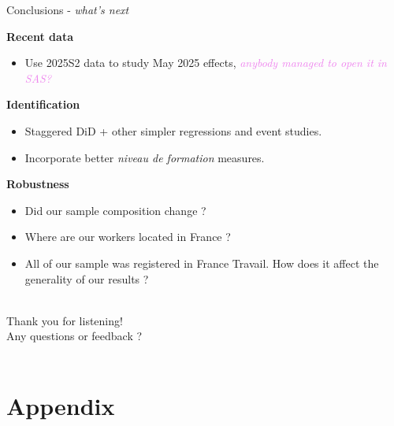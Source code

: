 \documentclass[aspectratio=169,10pt,xcolor={dvipsnames}]{beamer}
\begin{document}
\begin{frame}{Conclusions - \textit{what's next}}

\alert{\textbf{Recent data}}
\begin{itemize}
	\item Use 2025S2 data to study May 2025 effects, \textcolor{violet}{\textit{anybody managed to open it in SAS?}}
\end{itemize}
\vspace{0.2cm}

\alert{\textbf{Identification}}
\begin{itemize}
	\item Staggered DiD + other simpler regressions and event studies.
	\item Incorporate better \textit{niveau de formation} measures.
\end{itemize}
\vspace{0.2cm}
\alert{\textbf{Robustness}}
\begin{itemize}
	\item Did our sample composition change ? 
	\item Where are our workers located in France ?
	\item All of our sample was registered in France Travail. How does it affect the generality of our results ?
\end{itemize}
\end{frame}

\begin{frame}
		\thispagestyle{empty}
		\begin{center}
			\textit{}\\
			{ \huge
				\vspace{1.3cm}
				\alert{Thank you for listening!}}\\
			\vspace{0.6cm} {\large \alert{Any questions or feedback ?}} \\
			\vspace{1.3cm}
			\textbf{} \\
			\vspace{0.8cm}
		\end{center}
	\end{frame}


\section*{Appendix}
\end{document}

